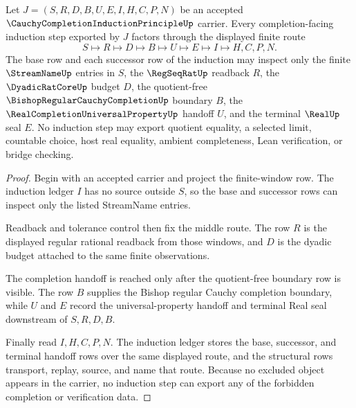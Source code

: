 \begin{theorem}
\label{thm:cauchy-completion-induction-principle-finite-row-induction}
Let $J=(S,R,D,B,U,E,I,H,C,P,N)$ be an accepted $\CauchyCompletionInductionPrincipleUp$ carrier. Every completion-facing induction step exported by $J$ factors through the displayed finite route
$$
S \longmapsto R \longmapsto D \longmapsto B \longmapsto U \longmapsto E \longmapsto I \longmapsto H,C,P,N .
$$
The base row and each successor row of the induction may inspect only the finite $\StreamNameUp$ entries in $S$, the $\RegSeqRatUp$ readback $R$, the $\DyadicRatCoreUp$ budget $D$, the quotient-free $\BishopRegularCauchyCompletionUp$ boundary $B$, the $\RealCompletionUniversalPropertyUp$ handoff $U$, and the terminal $\RealUp$ seal $E$. No induction step may export quotient equality, a selected limit, countable choice, host real equality, ambient completeness, Lean verification, or bridge checking.
\end{theorem}
\begin{proof}
Begin with an accepted carrier and project the finite-window row. The induction ledger $I$ has no source outside $S$, so the base and successor rows can inspect only the listed StreamName entries.

Readback and tolerance control then fix the middle route. The row $R$ is the displayed regular rational readback from those windows, and $D$ is the dyadic budget attached to the same finite observations.

The completion handoff is reached only after the quotient-free boundary row is visible. The row $B$ supplies the Bishop regular Cauchy completion boundary, while $U$ and $E$ record the universal-property handoff and terminal Real seal downstream of $S,R,D,B$.

Finally read $I,H,C,P,N$. The induction ledger stores the base, successor, and terminal handoff rows over the same displayed route, and the structural rows transport, replay, source, and name that route. Because no excluded object appears in the carrier, no induction step can export any of the forbidden completion or verification data.
\end{proof}

